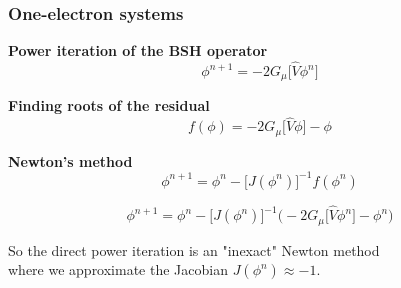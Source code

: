 \documentclass[mathserif, 10pt]{beamer}
\begin{document}
\begin{frame}
    \frametitle{One-electron systems}
    \centering
    \textbf{Power iteration of the BSH operator}
    \begin{equation}
	\nonumber
	\phi^{n+1} = -2G_{\mu}\Big[\hat{V} \phi^n\Big]
    \end{equation}

    \vspace{3mm}

    \textbf{Finding roots of the residual}
    \begin{equation}
	\nonumber
	f(\phi) = -2G_{\mu}\big[\hat{V} \phi\big] -\phi
    \end{equation}

    \vspace{3mm}

    \pause
    \textbf{Newton's method}
    \begin{equation}
	\nonumber
	\phi^{n+1} = \phi^n - \Big[J(\phi^n)\Big]^{-1} f(\phi^n)
    \end{equation}

    \pause
    \begin{equation}
	\nonumber
	\phi^{n+1} = \phi^n - \Big[J(\phi^n)\Big]^{-1}
	\bigg(-2G_{\mu}\Big[\hat{V}\phi^n\Big] - \phi^n\bigg)
    \end{equation}

    \vspace{3mm}

    \pause
    So the direct power iteration is an "inexact" Newton method\\
    where we approximate the Jacobian $J(\phi^n) \approx -1$.
\end{frame}
\end{document}
